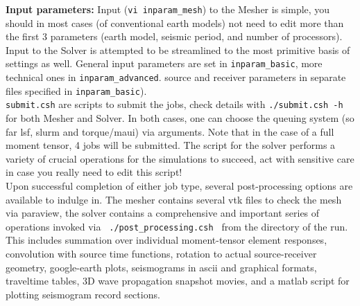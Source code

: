 \documentclass[11pt,letter,fleqn,english,notitlepage]{article}
\begin{document}

\textbf{Input parameters: } Input ({\tt vi inparam\_mesh}) to the
Mesher is simple, you should in most cases (of conventional earth models) not
need to edit more than the first 3 parameters (earth model, seismic period, and
number of processors).  Input to the Solver is attempted to be streamlined to
the most primitive basis of settings as well. General input parameters are set
in {\tt inparam\_basic}, more technical ones in {\tt inparam\_advanced}.  source and receiver parameters in separate files specified in {\tt inparam\_basic}).\\

{\tt submit.csh} are scripts to submit the jobs, check details with
{\tt ./submit.csh -h} for both Mesher and Solver. In both cases, one can
choose the queuing system (so far lsf, slurm and torque/maui) via arguments. 
Note that in the case of a full moment tensor, 4 jobs will be submitted.
The script for the solver performs a variety
of crucial operations for the simulations to succeed, act with sensitive care
in case you really need to edit this script! \\

Upon successful completion of either job type, several
post-processing options are available to indulge in. The mesher contains
several vtk files to check the mesh via paraview, the solver contains a
comprehensive and important series of operations invoked via {\tt
./post\_processing.csh } from the directory of the run. This includes summation
over individual moment-tensor element responses, convolution with source time
functions, rotation to actual source-receiver geometry, google-earth plots,
seismograms in ascii and graphical formats, traveltime tables, 3D wave
propagation snapshot movies, and a matlab script for plotting seismogram record
sections.
\end{document}
